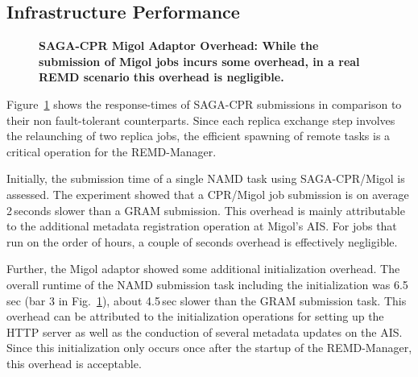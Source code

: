 \documentclass{rspublic}
\begin{document}
\subsection{Infrastructure Performance}
\begin{figure}[ht]
    \centering
    \caption{\footnotesize \bf SAGA-CPR Migol Adaptor Overhead: While the submission of Migol jobs incurs some overhead, in a real REMD scenario this overhead is negligible.}       
    \label{fig:performance_perf_submission}
\end{figure}           

Figure~\ref{fig:performance_perf_submission} shows the response-times
of SAGA-CPR submissions in comparison to their non fault-tolerant
counterparts. Since each replica exchange step involves the
relaunching of two replica jobs, the efficient spawning of remote
tasks is a critical operation for the REMD-Manager.

Initially, the submission time of a single NAMD task using
SAGA-CPR/Migol is assessed. The experiment showed that a CPR/Migol job
submission is on average 2\,seconds slower than a GRAM
submission. This overhead is mainly attributable to the additional
metadata registration operation at Migol's AIS. For jobs that run on
the order of hours, a couple of seconds overhead is effectively
negligible.

Further, the Migol adaptor showed some additional initialization
overhead. The overall runtime of the NAMD submission task including
the initialization was 6.5\,sec (bar 3 in
Fig.~\ref{fig:performance_perf_submission}), about 4.5\,sec slower
than the GRAM submission task. This overhead can be attributed to the
initialization operations for setting up the HTTP server as well as
the conduction of several metadata updates on the AIS. Since this
initialization only occurs once after the startup of the REMD-Manager,
this overhead is acceptable.
                                                                                                                    
\end{document}
